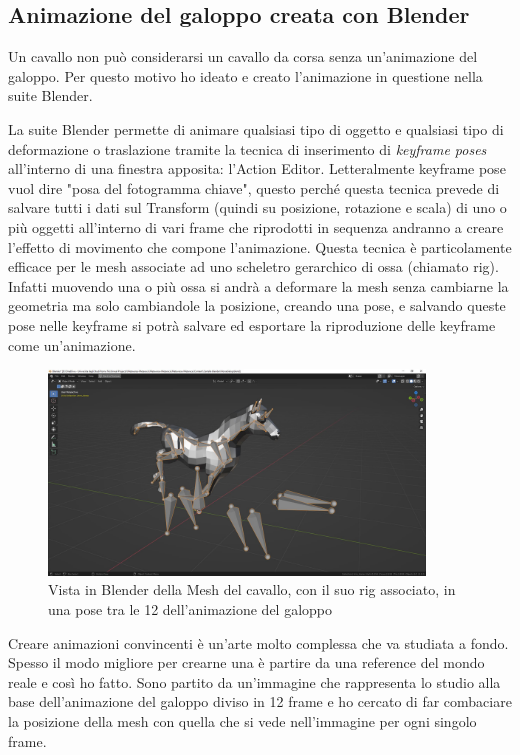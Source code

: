    \subsection{Animazione del galoppo creata con Blender}

    Un cavallo non può considerarsi un cavallo da corsa senza un'animazione del galoppo.
    Per questo motivo ho ideato e creato l'animazione in questione nella suite Blender.

    La suite Blender permette di animare qualsiasi tipo di oggetto e qualsiasi tipo di deformazione o traslazione tramite la tecnica di inserimento di \textit{keyframe poses} all'interno di una finestra apposita: l'Action Editor. 
    Letteralmente keyframe pose vuol dire "posa del fotogramma chiave", questo perché questa tecnica prevede di salvare tutti i dati sul Transform (quindi su posizione, rotazione e scala) di uno o più oggetti all'interno di vari frame che riprodotti in sequenza andranno a creare l'effetto di movimento che compone l'animazione.
    Questa tecnica è particolamente efficace per le mesh associate ad uno scheletro gerarchico di ossa (chiamato rig).
    Infatti muovendo una o più ossa si andrà a deformare la mesh senza cambiarne la geometria ma solo cambiandole la posizione, creando una pose, e salvando queste pose nelle keyframe si potrà salvare ed esportare la riproduzione delle keyframe come un'animazione.

    \begin{figure}[!ht]
        \centering
        \includegraphics[width=10cm]{figure/HorseRig.JPG}
        \caption{Vista in Blender della Mesh del cavallo, con il suo rig associato, in una pose tra le 12 dell'animazione del galoppo}
    \end{figure}

    Creare animazioni convincenti è un'arte molto complessa che va studiata a fondo.
    Spesso il modo migliore per crearne una è partire da una reference del mondo reale e così ho fatto.
    Sono partito da un'immagine che rappresenta lo studio alla base dell'animazione del galoppo diviso in 12 frame e ho cercato di far combaciare la posizione della mesh con quella che si vede nell'immagine per ogni singolo frame. 

